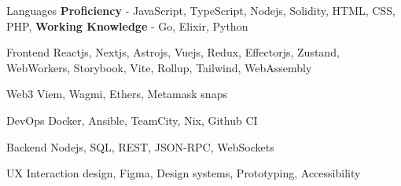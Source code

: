 

\begin{cvskills}

  \cvskill
    {Languages} %
    {\textbf{Proficiency} - JavaScript, TypeScript, Nodejs, Solidity, HTML, CSS, PHP, \textbf{Working Knowledge} - Go, Elixir, Python} %

  \cvskill
    {Frontend} %
    {Reactjs, Nextjs, Astrojs, Vuejs, Redux, Effectorjs, Zustand, WebWorkers, Storybook, Vite, Rollup, Tailwind, WebAssembly} %

  \cvskill
    {Web3} %
    {Viem, Wagmi, Ethers, Metamask snaps} %

  \cvskill
    {DevOps} %
    {Docker, Ansible, TeamCity, Nix, Github CI} %

  \cvskill
    {Backend} %
    {Nodejs, SQL, REST, JSON-RPC, WebSockets} %

  \cvskill
    {UX} %
    {Interaction design, Figma, Design systems, Prototyping, Accessibility} %

\end{cvskills}
